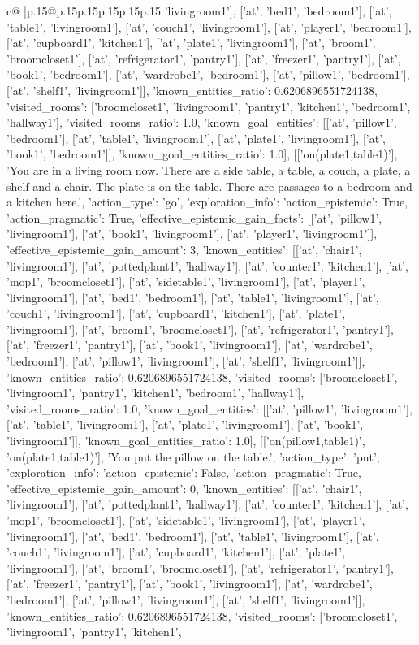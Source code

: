 \documentclass{article}
\begin{document}
{\begin{supertabular}{c@{$\;$}|p{.15\linewidth}@{}p{.15\linewidth}p{.15\linewidth}p{.15\linewidth}p{.15\linewidth}p{.15\linewidth}}
{{{'livingroom1'], ['at', 'bed1', 'bedroom1'], ['at', 'table1', 'livingroom1'], ['at', 'couch1', 'livingroom1'], ['at', 'player1', 'bedroom1'], ['at', 'cupboard1', 'kitchen1'], ['at', 'plate1', 'livingroom1'], ['at', 'broom1', 'broomcloset1'], ['at', 'refrigerator1', 'pantry1'], ['at', 'freezer1', 'pantry1'], ['at', 'book1', 'bedroom1'], ['at', 'wardrobe1', 'bedroom1'], ['at', 'pillow1', 'bedroom1'], ['at', 'shelf1', 'livingroom1']], 'known_entities_ratio': 0.6206896551724138, 'visited_rooms': ['broomcloset1', 'livingroom1', 'pantry1', 'kitchen1', 'bedroom1', 'hallway1'], 'visited_rooms_ratio': 1.0, 'known_goal_entities': [['at', 'pillow1', 'bedroom1'], ['at', 'table1', 'livingroom1'], ['at', 'plate1', 'livingroom1'], ['at', 'book1', 'bedroom1']], 'known_goal_entities_ratio': 1.0}}], [['on(plate1,table1)'], 'You are in a living room now. There are a side table, a table, a couch, a plate, a shelf and a chair. The plate is on the table. There are passages to a bedroom and a kitchen here.', {'action_type': 'go', 'exploration_info': {'action_epistemic': True, 'action_pragmatic': True, 'effective_epistemic_gain_facts': [['at', 'pillow1', 'livingroom1'], ['at', 'book1', 'livingroom1'], ['at', 'player1', 'livingroom1']], 'effective_epistemic_gain_amount': 3, 'known_entities': [['at', 'chair1', 'livingroom1'], ['at', 'pottedplant1', 'hallway1'], ['at', 'counter1', 'kitchen1'], ['at', 'mop1', 'broomcloset1'], ['at', 'sidetable1', 'livingroom1'], ['at', 'player1', 'livingroom1'], ['at', 'bed1', 'bedroom1'], ['at', 'table1', 'livingroom1'], ['at', 'couch1', 'livingroom1'], ['at', 'cupboard1', 'kitchen1'], ['at', 'plate1', 'livingroom1'], ['at', 'broom1', 'broomcloset1'], ['at', 'refrigerator1', 'pantry1'], ['at', 'freezer1', 'pantry1'], ['at', 'book1', 'livingroom1'], ['at', 'wardrobe1', 'bedroom1'], ['at', 'pillow1', 'livingroom1'], ['at', 'shelf1', 'livingroom1']], 'known_entities_ratio': 0.6206896551724138, 'visited_rooms': ['broomcloset1', 'livingroom1', 'pantry1', 'kitchen1', 'bedroom1', 'hallway1'], 'visited_rooms_ratio': 1.0, 'known_goal_entities': [['at', 'pillow1', 'livingroom1'], ['at', 'table1', 'livingroom1'], ['at', 'plate1', 'livingroom1'], ['at', 'book1', 'livingroom1']], 'known_goal_entities_ratio': 1.0}}], [['on(pillow1,table1)', 'on(plate1,table1)'], 'You put the pillow on the table.', {'action_type': 'put', 'exploration_info': {'action_epistemic': False, 'action_pragmatic': True, 'effective_epistemic_gain_amount': 0, 'known_entities': [['at', 'chair1', 'livingroom1'], ['at', 'pottedplant1', 'hallway1'], ['at', 'counter1', 'kitchen1'], ['at', 'mop1', 'broomcloset1'], ['at', 'sidetable1', 'livingroom1'], ['at', 'player1', 'livingroom1'], ['at', 'bed1', 'bedroom1'], ['at', 'table1', 'livingroom1'], ['at', 'couch1', 'livingroom1'], ['at', 'cupboard1', 'kitchen1'], ['at', 'plate1', 'livingroom1'], ['at', 'broom1', 'broomcloset1'], ['at', 'refrigerator1', 'pantry1'], ['at', 'freezer1', 'pantry1'], ['at', 'book1', 'livingroom1'], ['at', 'wardrobe1', 'bedroom1'], ['at', 'pillow1', 'livingroom1'], ['at', 'shelf1', 'livingroom1']], 'known_entities_ratio': 0.6206896551724138, 'visited_rooms': ['broomcloset1', 'livingroom1', 'pantry1', 'kitchen1', }}}
\end{supertabular}}
\end{document}
